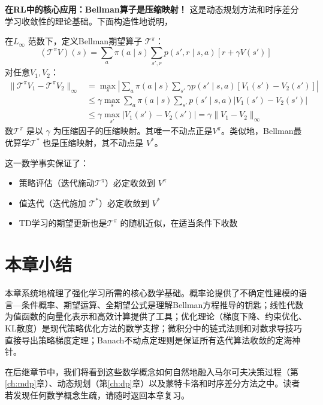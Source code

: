\begin{remark} \textbf{在RL中的核心应用：Bellman算子是压缩映射！}
这是动态规划方法和时序差分学习收敛性的理论基础。下面构造性地说明，

在$L_\infty$ 范数下，定义Bellman期望算子 $\mathcal{T}^{\pi}$：
\[
(\mathcal{T}^{\pi} V)(s) = \sum_a \pi(a \mid s) \sum_{s', r} p(s', r \mid s, a) [r + \gamma V(s')]
\]
对任意$V_1, V_2$：
\begin{align*}
\| \mathcal{T}^{\pi} V_1 - \mathcal{T}^{\pi} V_2 \|_\infty &= \max_s \left| \sum_a \pi(a \mid s) \sum_{s'} \gamma p(s' \mid s, a) [V_1(s') - V_2(s')] \right| \\
&\le \gamma \max_s \sum_a \pi(a \mid s) \sum_{s'} p(s' \mid s, a) |V_1(s') - V_2(s')| \\
&\le \gamma \max_{s'} |V_1(s') - V_2(s')| = \gamma \|V_1 - V_2\|_\infty
\end{align*}
数$\mathcal{T}^{\pi}$ 是以 $\gamma$ 为压缩因子的压缩映射。其唯一不动点正是$V^{\pi}$。类似地，Bellman最优算学$\mathcal{T}^{*}$ 也是压缩映射，其不动点是 $V^{*}$。
\end{remark}

这一数学事实保证了：
\begin{itemize}
    \item 策略评估（迭代施动$\mathcal{T}^{\pi}$）必定收敛到 $V^{\pi}$
    \item 值迭代（迭代施加 $\mathcal{T}^{*}$）必定收敛到 $V^{*}$
    \item TD学习的期望更新也是$\mathcal{T}^{\pi}$ 的随机近似，在适当条件下收数
\end{itemize}

\section{本章小结}

本章系统地梳理了强化学习所需的核心数学基础。概率论提供了不确定性建模的语言---条件概率、期望运算、全期望公式是理解Bellman方程推导的钥匙；线性代数为值函数的向量化表示和高效计算提供了工具；优化理论（梯度下降、约束优化、KL散度）是现代策略优化方法的数学支撑；微积分中的链式法则和对数求导技巧直接导出策略梯度定理；Banach不动点定理则是保证所有迭代算法收敛的定海神针。

在后继章节中，我们将看到这些数学概念如何自然地融入马尔可夫决策过程（第\ref{ch:mdp}章）、动态规划（第\ref{ch:dp}章）以及蒙特卡洛和时序差分方法之中。读者若发现任何数学概念生疏，请随时返回本章复习。

